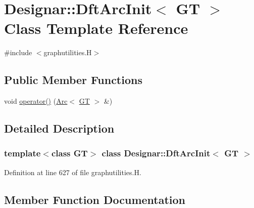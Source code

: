 \hypertarget{class_designar_1_1_dft_arc_init}{}\section{Designar\+:\+:Dft\+Arc\+Init$<$ GT $>$ Class Template Reference}
\label{class_designar_1_1_dft_arc_init}


{\ttfamily \#include $<$graphutilities.\+H$>$}

\subsection*{Public Member Functions}
\begin{DoxyCompactItemize}
\item 
void \hyperlink{class_designar_1_1_dft_arc_init_a93a8fffe70b19c86510dd4c2588d6249}{operator()} (\hyperlink{namespace_designar_a3f55fb5513d62ff47cbc8f72b8e95d6f}{Arc}$<$ \hyperlink{demo-buildgraph_8_c_a3001c40d2c31ca87ed96cd7d1334a55e}{GT} $>$ \&)
\end{DoxyCompactItemize}


\subsection{Detailed Description}
\subsubsection*{template$<$class GT$>$\newline
class Designar\+::\+Dft\+Arc\+Init$<$ G\+T $>$}



Definition at line 627 of file graphutilities.\+H.



\subsection{Member Function Documentation}
\mbox{\label{class_designar_1_1_dft_arc_init_a93a8fffe70b19c86510dd4c2588d6249}} 
